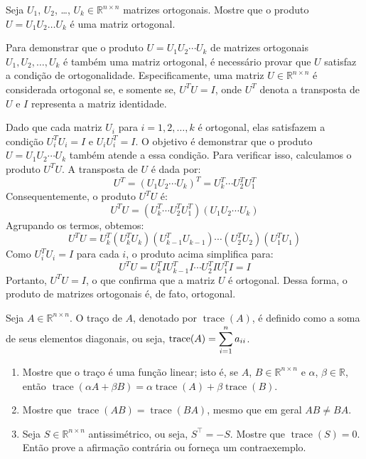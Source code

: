 \begin{question}
  Seja $U_1$, $U_2$, \dots, $U_k \in \mathbb{R}^{n\times n}$ matrizes ortogonais. Mostre que o produto $U=U_1U_2\dots U_k$ é uma matriz ortogonal.
\end{question}
\begin{resolution}
  Para demonstrar que o produto $U = U_1 U_2 \cdots U_k$ de matrizes ortogonais $U_1, U_2, \ldots, U_k$ é também uma matriz ortogonal, é necessário provar que $U$ satisfaz a condição de ortogonalidade. Especificamente, uma matriz $U \in \mathbb{R}^{n \times n}$ é considerada ortogonal se, e somente se, $U^T U = I$, onde $U^T$ denota a transposta de $U$ e $I$ representa a matriz identidade.

  Dado que cada matriz $U_i$ para $i = 1, 2, \ldots, k$ é ortogonal, elas satisfazem a condição $U_i^T U_i = I$ e $U_i U_i^T = I$. O objetivo é demonstrar que o produto $U = U_1 U_2 \cdots U_k$ também atende a essa condição. Para verificar isso, calculamos o produto $U^T U$. A transposta de $U$ é dada por:
  \begin{equation}
    U^T = (U_1 U_2 \cdots U_k)^T = U_k^T \cdots U_2^T U_1^T
  \end{equation}
  Consequentemente, o produto $U^T U$ é:
  \begin{equation}
    U^T U = (U_k^T \cdots U_2^T U_1^T) (U_1 U_2 \cdots U_k)
  \end{equation}
  Agrupando os termos, obtemos:
  \begin{equation}
    U^T U = U_k^T (U_k^T U_k) (U_{k-1}^T U_{k-1}) \cdots (U_2^T U_2) (U_1^T U_1)
  \end{equation}
  Como $U_i^T U_i = I$ para cada $i$, o produto acima simplifica para:
  \begin{equation}
    U^T U = U_k^T I U_{k-1}^T I \cdots U_2^T I U_1^T I = I
  \end{equation}
  Portanto, $U^T U = I$, o que confirma que a matriz $U$ é ortogonal. Dessa forma, o produto de matrizes ortogonais é, de fato, ortogonal.
\end{resolution}

\begin{question}
  Seja $A \in \mathbb{R}^{n \times n}$. O traço de $A$, denotado por $\operatorname{trace}(A)$, é definido como a soma de seus elementos diagonais, ou seja, $\operatorname{trace}(A) = \displaystyle \sum_{i=1}^n a_{ii}$.
  \begin{enumerate}[label=(\alph*)]
    \item Mostre que o traço é uma função linear; isto é, se $A$, $B \in \mathbb{R}^{n \times n}$ e $\alpha$, $\beta \in \mathbb{R}$, então $\operatorname{trace}(\alpha A + \beta B) = \alpha \operatorname{trace}(A) + \beta \operatorname{trace}(B)$.
    \item Mostre que $\operatorname{trace}(AB) = \operatorname{trace}(BA)$, mesmo que em geral $AB \neq BA$.
    \item Seja $S \in \mathbb{R}^{n \times n}$ antissimétrico, ou seja, $S^{\top} = -S$. Mostre que $\operatorname{trace}(S) = 0$. Então prove a afirmação contrária ou forneça um contraexemplo.
  \end{enumerate}
\end{question}

